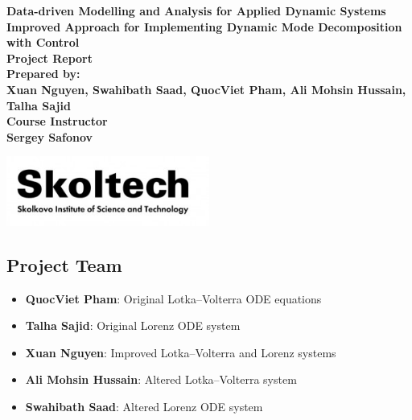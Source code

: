 \documentclass[a4paper,12pt]{report}
\theoremstyle{definition}
\numberwithin{equation}{section}
\begin{document}
\begin{titlepage}
    \centering
    \vspace*{2cm}
    
    {\Large \textbf{Data-driven Modelling and Analysis for Applied Dynamic Systems}} \\[1.5cm]
    
    {\large \textbf{Improved Approach for Implementing Dynamic Mode Decomposition with Control}} \\[1cm]
    {\large \textbf{Project Report}} \\[1cm]
    {\large \textbf{Prepared by:}} \\
    {\large \textbf{\textrm{Xuan Nguyen, Swahibath Saad, QuocViet Pham, Ali Mohsin Hussain, Talha Sajid
}}} \\[1cm]

    {\large \textbf{Course Instructor}} \\
    {\large \textbf{\textrm{Sergey Safonov
    }}} \\[1cm]
    
    
    
    
    
    
    \vspace{2cm}
    
     \includegraphics[width=0.5\textwidth]{Snimok-ekrana-2022-09-19-v-15.24.24-300x103.jpg}  %
    
\end{titlepage}

\subsection*{Project Team}
\begin{itemize}
    \item \textbf{QuocViet Pham}: Original Lotka–Volterra ODE equations
    \item \textbf{Talha Sajid}: Original Lorenz ODE system
    \item \textbf{Xuan Nguyen}: Improved Lotka–Volterra and Lorenz systems
    \item \textbf{Ali Mohsin Hussain}:  Altered Lotka–Volterra system
    \item \textbf{Swahibath Saad}:  Altered Lorenz ODE system
\end{itemize}
\end{document}

